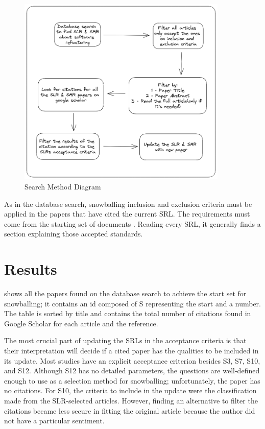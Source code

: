 \begin{figure}[ht!]
\SetCaptionWidth{\textwidth}
\caption{Search Method Diagram}
\label{fig-snow}
\includegraphics[width =100mm]{Chapter-3/Figures/snowballing_diagram.png}
\end{figure}
\FloatBarrier

As in the database search, snowballing inclusion and exclusion criteria must be applied in the papers that have cited the current SRL. The requirements must come from the starting set of documents \cite{Wohlin2020}. Reading every SRL, it generally finds a section explaining those accepted standards.


\section{Results}
\label{sec-results}
 shows all the papers found on the database search to achieve the start set for snowballing; it contains an id composed of S representing the start and a number. The table is sorted by title and contains the total number of citations found in Google Scholar for each article and the reference.



The most crucial part of updating the SRLs in the acceptance criteria is that their interpretation will decide if a cited paper has the qualities to be included in its update. Most studies have an explicit acceptance criterion besides S3, S7, S10, and S12. Although S12 has no detailed parameters, the questions are well-defined enough to use as a selection method for snowballing; unfortunately, the paper has no citations. For S10, the criteria to include in the update were the classification made from the SLR-selected articles. However, finding an alternative to filter the citations became less secure in fitting the original article because the author did not have a particular sentiment. 

